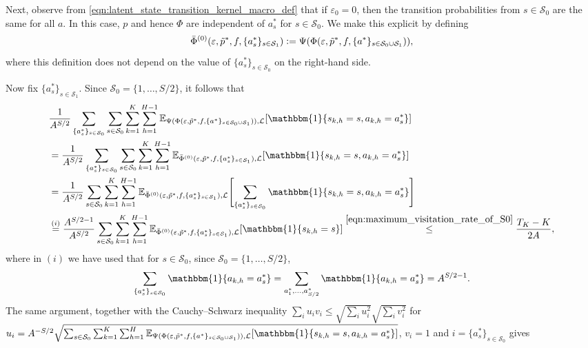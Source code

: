 \documentclass[11pt]{article}
\newcommand{\eqdef}{\vcentcolon=}
\newcommand{\mcL}{\mathcal{L}}
\newcommand{\mcS}{\mathcal{S}}
\newcommand{\mbbE}{\mathbb{E}}
\theoremstyle{definition}
\theoremstyle{definition}
\begin{document}
Next, observe from \eqref{eqn:latent_state_transition_kernel_macro_def} that if $\varepsilon_0 = 0$, then the transition probabilities from $s\in\mcS_0$ are the same for all $a$.
In this case, $p$ and hence $\Phi$ are independent of $a_s^*$ for $s\in\mcS_0$.
We make this explicit by defining
\begin{equation}
	\bar{\Phi}^{(0)}(\varepsilon,\tilde{p}^*,f,\{a_s^*\}_{s\in \mcS_1})
	\eqdef
	\Psi(\Phi(\varepsilon,\tilde{p}^*,f,\{a^*\}_{s\in\mcS_0\cup\mcS_1}))
	,
\end{equation}
where this definition does not depend on the value of $\{a_s^*\}_{s\in \mcS_0}$ on the right-hand side.

Now fix $\{a_s^*\}_{s \in \mcS_1}$.
Since $\mcS_0 = \{1,\ldots,S/2\}$, it follows that
\begin{align}
	 &
	\frac{1}{A^{S/2}}
	\sum_{\{a_s^*\}_{s \in \mcS_0}}
	\sum_{s\in\mcS_0}
	\sum_{k=1}^K
	\sum_{h=1}^{H-1}
	\mbbE_{\Psi(\Phi(\varepsilon,\tilde{p}^*,f,\{a^*\}_{s\in\mcS_0\cup\mcS_1})),\mcL}[\mathbbm{1}\{s_{k,h}=s,a_{k,h}=a_s^*\}]
	\nonumber
	\\
	 &
	=
	\frac{1}{A^{S/2}}
	\sum_{\{a_s^*\}_{s \in \mcS_0}}
	\sum_{s\in\mcS_0}
	\sum_{k=1}^K
	\sum_{h=1}^{H-1}
	\mbbE_{\bar{\Phi}^{(0)}(\varepsilon,\tilde{p}^*,f,\{a^*_s\}_{s \in \mcS_1}),\mcL}[\mathbbm{1}\{s_{k,h}=s,a_{k,h}=a_s^*\}]
	\nonumber
	\\
	 &
	=
	\frac{1}{A^{S/2}}
	\sum_{s\in\mcS_0}
	\sum_{k=1}^K
	\sum_{h=1}^{H-1}
	\mbbE_{\bar{\Phi}^{(0)}(\varepsilon,\tilde{p}^*,f,\{a^*_s\}_{s \in \mcS_1}),\mcL}\Biggl[
	\sum_{\{a_s^*\}_{s \in \mcS_0}}
	\mathbbm{1}\{s_{k,h}=s,a_{k,h}=a_s^*\}
	\Biggr]
	\nonumber
	\\
	 &
	\overset{(i)}{=}
	\frac{A^{S/2-1}}{A^{S/2}}
	\sum_{s\in\mcS_0}
	\sum_{k=1}^K
	\sum_{h=1}^{H-1}
	\mbbE_{\bar{\Phi}^{(0)}(\varepsilon,\tilde{p}^*,f,\{a^*_s\}_{s \in \mcS_1}),\mcL}[\mathbbm{1}\{s_{k,h}=s\}]
	\overset{\eqref{eqn:maximum_visitation_rate_of_S0}}{\leq}
	\frac{T_K-K}{2A}
	,
	\label{eqn:optimal_actions_under_true_model_bound_term_1}
\end{align}
where in $(i)$ we have used that for $s\in\mcS_0$, since $\mcS_0 = \{1,\ldots,S/2\}$,
\begin{equation}
	\sum_{\{a_s^*\}_{s \in \mcS_0}}
	\mathbbm{1}\{a_{k,h}=a_s^*\}
	=
	\sum_{a^*_1,\ldots, a^*_{S/2}}
	\mathbbm{1}\{a_{k,h}=a_s^*\}
	=
	A^{S/2-1}
	.
\end{equation}
The same argument, together with the Cauchy--Schwarz inequality $\sum_{i}u_iv_i \leq \sqrt{\sum_i u_i^2}\sqrt{\sum_i v_i^2}$ for $u_i = A^{-S/2}\sqrt{\sum_{s\in\mcS_0}\sum_{k=1}^K\sum_{h=1}^{H}\mbbE_{\Psi(\Phi(\varepsilon,\tilde{p}^*,f,\{a^*\}_{s\in\mcS_0\cup\mcS_1})),\mcL}[\mathbbm{1}\{s_{k,h}=s,a_{k,h}=a_s^*\}]}$, $v_i = 1$ and $i=\{a_s^*\}_{s\in\mcS_0}$ gives
\end{document}
